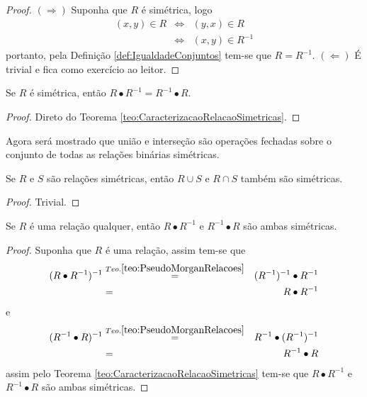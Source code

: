 \begin{proof}
	$(\Rightarrow)$ Suponha que $R$ é simétrica, logo
	\begin{eqnarray*}
		(x, y) \in R & \Longleftrightarrow & (y, x) \in R\\
		& \Longleftrightarrow & (x, y) \in R^{-1}
	\end{eqnarray*}
	portanto, pela Definição \ref{def:IgualdadeConjuntos} tem-se que $R = R^{-1}$. $(\Leftarrow)$ É trivial e fica como exercício ao leitor.
\end{proof}


\begin{corolario}
	Se $R$ é simétrica, então $R \bullet R^{-1} = R^{-1} \bullet R$.
\end{corolario}

\begin{proof}
	Direto do Teorema \ref{teo:CaracterizacaoRelacaoSimetricas}.
\end{proof}

Agora será mostrado que união e interseção são operações fechadas sobre o conjunto de todas as relações binárias simétricas.

\begin{teorema}\label{teo:FechamentoSimetricas}
	Se $R$ e $S$ são relações simétricas, então $R \cup S$ e $R \cap S$ também são simétricas.
\end{teorema}

\begin{proof}
	Trivial.
\end{proof}

\begin{teorema}
	Se $R$ é uma relação qualquer, então $R \bullet R^{-1}$ e  $R^{-1} \bullet R$ são ambas simétricas.
\end{teorema}

\begin{proof}
	Suponha que $R$ é uma relação, assim tem-se que 
	\begin{eqnarray*}
		(R \bullet R^{-1})^{-1} & \stackrel{Teo. \ref{teo:PseudoMorganRelacoes}}{=} & (R^{-1})^{-1} \bullet R^{-1}\\
		&\stackrel{}{=}& R \bullet R^{-1}
	\end{eqnarray*}
	e
	\begin{eqnarray*}
		(R^{-1} \bullet R)^{-1} & \stackrel{Teo. \ref{teo:PseudoMorganRelacoes}}{=} &  R^{-1} \bullet (R^{-1})^{-1}\\
		&\stackrel{}{=}& R^{-1} \bullet R
	\end{eqnarray*}
	assim pelo Teorema \ref{teo:CaracterizacaoRelacaoSimetricas} tem-se que $R \bullet R^{-1}$ e  $R^{-1} \bullet R$ são ambas simétricas.
\end{proof}

